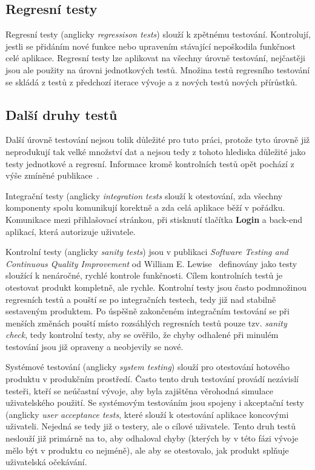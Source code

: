 \subsection{Regresní testy}
\label{regresni_testy}
Regresní testy (anglicky \textit{regressison tests}) slouží k zpětnému testování. Kontrolují, jestli se přidáním nové funkce nebo upravením stávající nepoškodila funkčnost celé aplikace.
Regresní testy lze aplikovat na všechny úrovně testování, nejčastěji jsou ale použity na úrovni jednotkových testů.
Množina testů regresního testování se skládá z testů z předchozí iterace vývoje a z nových testů nových přírůstků.

\subsection{Další druhy testů}
\label{subsection:dalsi_druhy_testu}
Další úrovně testování nejsou tolik důležité pro tuto práci, protože tyto úrovně již neprodukují tak velké množství dat a nejsou tedy z tohoto hlediska důležité jako testy jednotkové a regresní. Informace kromě kontrolních testů opět pochází z výše zmíněné publikace~\cite{SoftwareTesting}.

Integrační testy (anglicky \textit{integration tests} slouží k otestování, zda všechny komponenty spolu komunikují korektně a zda celá aplikace běží v pořádku.
Komunikace mezi přihlašovací stránkou, při stisknutí tlačítka \textbf{Login} a back-end aplikací, která autorizuje uživatele.

Kontrolní testy (anglicky \textit{sanity tests}) jsou v publikaci \textit{Software Testing and Continuous Quality Improvement} od William E. Lewise~\cite{SoftwareTestingQualityImprovement} definovány jako testy sloužící k nenáročné, rychlé kontrole funkčnosti. Cílem kontrolních testů je otestovat produkt kompletně, ale rychle. Kontrolní testy jsou často podmnožinou regresních testů a pouští se po integračních testech, tedy již nad stabilně sestaveným produktem.
Po úspěšně zakončeném integračním testování se při menších změnách pouští místo rozsáhlých regresních testů pouze tzv. \textit{sanity check}, tedy kontrolní testy, aby se ověřilo, že chyby odhalené při minulém testování jsou již opraveny a neobjevily se nové.

Systémové testování (anglicky \textit{system testing}) slouží pro otestování hotového produktu v produkčním prostředí. Často tento druh testování provádí nezávislí testeři, kteří se neúčastní vývoje, aby byla zajištěna věrohodná simulace uživatelského použití.
Se systémovým testováním jsou spojeny i akceptační testy (anglicky \textit{user acceptance tests}, které slouží k otestování aplikace koncovými uživateli. Nejedná se tedy již o testery, ale o cílové uživatele. Tento druh testů neslouží již primárně na to, aby odhaloval chyby (kterých by v této fázi vývoje mělo být v produktu co nejméně), ale aby se otestovalo, jak produkt splňuje uživatelská očekávání.


